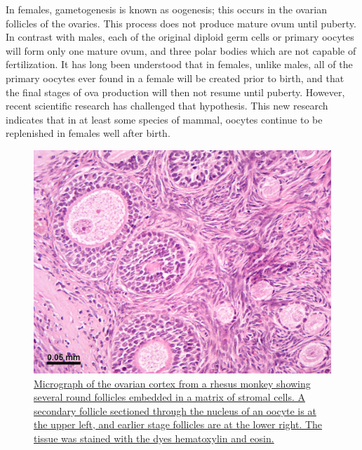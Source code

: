 In females, gametogenesis is known as oogenesis; this occurs in the ovarian follicles of the ovaries. This process does not produce mature ovum until puberty. In contrast with males, each of the original diploid germ cells or primary oocytes will form only one mature ovum, and three polar bodies which are not capable of fertilization. It has long been understood that in females, unlike males, all of the primary oocytes ever found in a female will be created prior to birth, and that the final stages of ova production will then not resume until puberty. However, recent scientific research has challenged that hypothesis. This new research indicates that in at least some species of mammal, oocytes continue to be replenished in females well after birth.



\begin{figure}

{\centering \includegraphics[width=0.7\linewidth]{./figures/reproductive_system/Ovarian_cortex_in_a_rhesus_monkey} 

}

\caption{\href{https://en.wikipedia.org/wiki/File:Ovarian_cortex_in_a_rhesus_monkey.jpg}{Micrograph of the ovarian cortex from a rhesus monkey showing several round follicles embedded in a matrix of stromal cells. A secondary follicle sectioned through the nucleus of an oocyte is at the upper left, and earlier stage follicles are at the lower right. The tissue was stained with the dyes hematoxylin and eosin.}}\label{fig:ovariancortex}
\end{figure}



